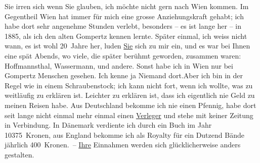 \pstart
           Sie irren sich wenn Sie glauben, ich möchte nicht gern nach Wien kommen. Im Gegentheil Wien hat immer für mich eine grosse Anziehungskraft gehabt; ich habe dort
               sehr angenehme Stunden verlebt, besonders – es ist lange her – in 1885,
               als ich den alten Gompertz kennen lernte.
               Später einmal, ich weiss nicht wann, es ist wohl 20 Jahre her, luden \uline{Sie} sich zu mir ein, und es war bei Ihnen eine \label{K_L02040-1v}\label{K_L02040-1}
               spät Abends, wo viele, die später berühmt \strikeout{\textcolor{gray}{×}\-\textcolor{gray}{×}\-\textcolor{gray}{×}} geworden, zusammen waren: Hoffmannsthal, Wassermann, und andere.
               Sonst habe ich in Wien nur bei Gompertz Menschen gesehen. Ich kenne {\pb}ja Niemand dort.\hspace*{2em}Aber ich bin in der Regel wie in einem Schraubenstock;
               ich kann nicht fort, wenn ich wollte, was zu weitläufig zu erklären ist. Leichter zu
               erklären ist, dass ich eigentlich nie Geld zu meinen Reisen habe. Aus Deutschland bekomme ich nie einen Pfennig, habe
               dort seit lange nicht einmal mehr einmal einen \uline{Verleger} und stehe mit keiner Zeitung in Verbindung. In Dänemark verdiente ich durch ein Buch im Jahr 10375 Kronen, aus
                  England bekomme ich als Royalty für ein
               Dutzend Bände jährlich 400 Kronen. – \uline{Ihre} Einnahmen
               werden sich glücklicherweise anders gestalten.\pend
           
